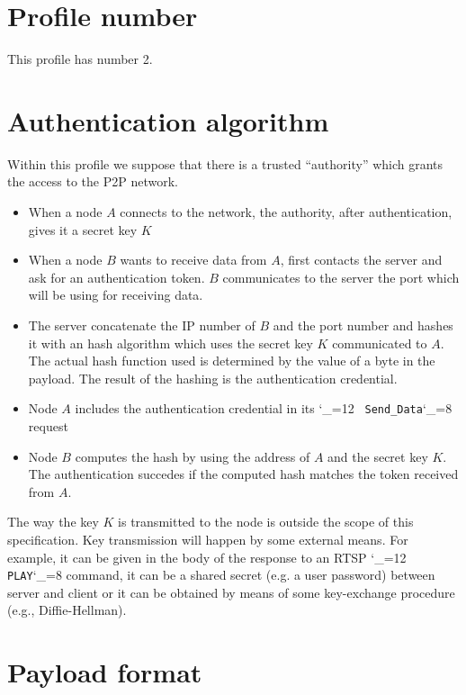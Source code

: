 \documentclass{rfc}
\def\ttt{\catcode`\_=12 \tttii}
\def\tttii#1!{{\tt #1}\catcode`\_=8{}}
\begin{document}
\section{Profile number}
\label{sect:2.0;transport_layer}

This profile has number 2.

\section{Authentication algorithm}
\label{sect:2.1;transport_layer}

Within this profile we suppose that there is a trusted ``authority''
which grants the access to the P2P network. 


\begin{itemize}
  \item When a node $A$ connects to the network, the authority, after
authentication, gives it a secret key $K$
  \item When a node $B$ wants to receive data from $A$, first contacts
  the server and ask for an authentication token.  $B$ communicates to
  the server the port which will be using for receiving data.
  \item The server concatenate the IP number of $B$ and the port
  number and hashes it with an hash algorithm which uses the secret
  key $K$ communicated to $A$.  The actual hash function used is
  determined by the value of a byte in the payload.  The result of the
  hashing is the authentication credential.
  \item Node $A$ includes the authentication credential in its \ttt
  Send_Data! request
  \item Node $B$ computes the hash by using the address of $A$ and the
  secret key $K$.  The authentication succedes if the computed hash
  matches the token received from $A$.
\end{itemize}

\begin{commento}
  The way the key $K$ is transmitted to the node is outside the scope
  of this specification.  Key transmission will happen by some
  external means.  For example, it can be given in the body of the
  response to an RTSP \ttt PLAY! command, it can be a shared secret
  (e.g. a user password) between server and client or it can be
  obtained by means of some key-exchange procedure (e.g.,
  Diffie-Hellman).
\end{commento}

\section{Payload format}
\label{sect:2.2;transport_layer}
\end{document}
